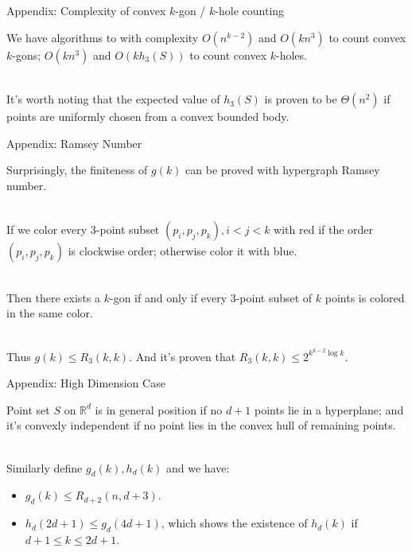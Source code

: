 \documentclass{beamer}
\begin{document}
\begin{frame}{Appendix: Complexity of convex $k$-gon / $k$-hole counting}

We have algorithms to with complexity $O(n^{k-2})$ and $O(kn^3)$ to count convex $k$-gons; $O(kn^3)$ and $O(kh_3(S))$ to count convex $k$-holes. \\~\ 

It's worth noting that the expected value of $h_3(S)$ is proven to be $\Theta(n^2)$ if points are uniformly chosen from a convex bounded body.
    
\end{frame}

\begin{frame}{Appendix: Ramsey Number}

Surprisingly, the finiteness of $g(k)$ can be proved with hypergraph Ramsey number. \\~\

If we color every 3-point subset $(p_i, p_j, p_k), i < j  < k$ with red if the order $(p_i, p_j, p_k)$ is clockwise order; otherwise color it with blue. \\~\

Then there exists a $k$-gon if and only if every 3-point subset of $k$ points is colored in the same color. \\~\

Thus $g(k) \le R_3(k ,k)$. And it's proven that $R_3(k, k) \le 2^{k^{k-2}\log k}$.

\end{frame}

\begin{frame}{Appendix: High Dimension Case}

Point set $S$ on $\mathbb{R}^d$ is in general  position if no $d+1$ points lie in a hyperplane; and it's convexly independent if no point lies in the convex hull of remaining points. \\~\

Similarly define $g_d(k), h_d(k)$ and we have:

\begin{itemize}
    \item 
$g_d(k) \le R_{d+2}(n, d+3)$.
    \item 
$h_d(2d+1) \le g_d(4d+1)$, which shows the existence of $h_d(k)$ if $d + 1 \le k \le 2d + 1$.
    
\end{itemize}




\end{frame}

\end{document}
